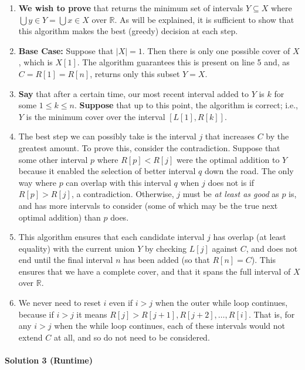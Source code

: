 \documentclass[11pt]{article}
\begin{document}
\begin{enumerate}
    \item \textbf{We wish to prove} that  returns the minimum set of intervals $Y \subseteq X$ where $\bigcup y \in Y = \bigcup x \in X$ over $\mathbb{R}$. As will be explained, it is sufficient to show that this algorithm makes the best (greedy) decision at each step.
    \item \textbf{Base Case:} Suppose that $|X| = 1$. Then there is only one possible cover of $X$, which is $X[1]$. The algorithm guarantees this is present on line 5 and, as $C = R[1] = R[n]$, returns only this subset $Y = X$.
    \item \textbf{Say} that after a certain time, our most recent interval added to $Y$ is $k$ for some $1 \leq k \leq n$. \textbf{Suppose} that up to this point, the algorithm is correct; i.e., $Y$ is the minimum cover over the interval $[L[1], R[k]]$.
    \item The best step we can possibly take is the interval $j$ that increases $C$ by the greatest amount. To prove this, consider the contradiction. Suppose that some other interval $p$ where $R[p] < R[j]$ were the optimal addition to $Y$ because it enabled the selection of better interval $q$ down the road. The only way where $p$ can overlap with this interval $q$ when $j$ does not is if $R[p] > R[j]$, a contradiction. Otherwise, $j$ must be \textit{at least as good} as $p$ is, and has more intervals to consider (some of which may be the true next optimal addition) than $p$ does.
    \item This algorithm ensures that each candidate interval $j$ has overlap (at least equality) with the current union $Y$ by checking $L[j]$ against $C$, and does not end until the final interval $n$ has been added (so that $R[n] = C$). This ensures that we have a complete cover, and that it spans the full interval of $X$ over $\mathbb{R}$.
    \item We never need to reset $i$ even if $i > j$ when the outer while loop continues, because if $i > j$ it means $R[j] > R[j + 1], R[j + 2], \dots, R[i]$. That is, for any $i > j$ when the while loop continues, each of these intervals would not extend $C$ at all, and so do not need to be considered.
\end{enumerate}

\paragraph{Solution 3 (Runtime)}
\end{document}
